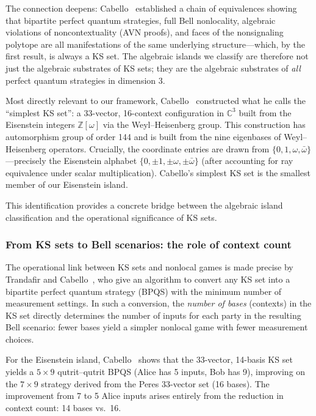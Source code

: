 \documentclass[12pt,a4paper]{article}
\newcommand{\C}{\mathbb{C}}
\newcommand{\Z}{\mathbb{Z}}
\begin{document}
The connection deepens: Cabello~\cite{Cabello2024equivalences} established a chain of equivalences showing that bipartite perfect quantum strategies, full Bell nonlocality, algebraic violations of noncontextuality (AVN proofs), and faces of the nonsignaling polytope are all manifestations of the same underlying structure---which, by the first result, is always a KS set. The algebraic islands we classify are therefore not just the algebraic substrates of KS sets; they are the algebraic substrates of \emph{all} perfect quantum strategies in dimension 3.

Most directly relevant to our framework, Cabello~\cite{Cabello2025simplest} constructed what he calls the ``simplest KS set'': a 33-vector, 16-context configuration in $\C^3$ built from the Eisenstein integers $\Z[\omega]$ via the Weyl--Heisenberg group. This construction has automorphism group of order 144 and is built from the nine eigenbases of Weyl--Heisenberg operators. Crucially, the coordinate entries are drawn from $\{0, 1, \omega, \bar\omega\}$---precisely the Eisenstein alphabet $\{0, \pm 1, \pm\omega, \pm\bar\omega\}$ (after accounting for ray equivalence under scalar multiplication). Cabello's simplest KS set is the smallest member of our Eisenstein island.

This identification provides a concrete bridge between the algebraic island classification and the operational significance of KS sets.

\subsubsection{From KS sets to Bell scenarios: the role of context count}\label{sec:ks-bell}

The operational link between KS sets and nonlocal games is made precise by Trandafir and Cabello~\cite{TrandafirCabello2025optimal}, who give an algorithm to convert any KS set into a bipartite perfect quantum strategy (BPQS) with the minimum number of measurement settings. In such a conversion, the \emph{number of bases} (contexts) in the KS set directly determines the number of inputs for each party in the resulting Bell scenario: fewer bases yield a simpler nonlocal game with fewer measurement choices.

For the Eisenstein island, Cabello~\cite{Cabello2025simplest} shows that the 33-vector, 14-basis KS set yields a $5 \times 9$ qutrit--qutrit BPQS (Alice has 5 inputs, Bob has 9), improving on the $7 \times 9$ strategy derived from the Peres 33-vector set (16 bases). The improvement from 7 to 5 Alice inputs arises entirely from the reduction in context count: 14 bases vs.\ 16.
\end{document}
